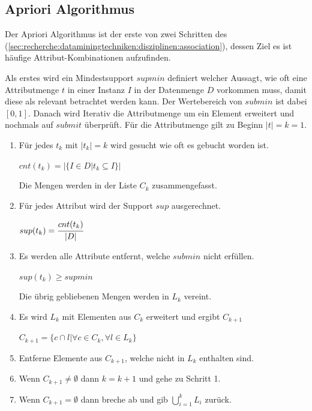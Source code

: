 \subsection{Apriori Algorithmus}
Der Apriori Algorithmus ist der erste von zwei Schritten des  (\cref{sec:recherche:dataminingtechniken:disziplinen:association}), dessen Ziel es ist häufige Attribut-Kombinationen aufzufinden. 

Als erstes wird ein Mindestsupport $supmin$ definiert welcher Aussagt, wie oft eine Attributmenge $t$ in einer Instanz $I$ in der Datenmenge $D$ vorkommen muss, damit diese als relevant betrachtet werden kann. Der Wertebereich von $submin$ ist dabei $[0,1]$. Danach wird Iterativ die Attributmenge um ein Element erweitert und nochmals auf $submit$ überprüft. Für die Attributmenge gilt zu Beginn $|t| = k = 1$.
\begin{enumerate}
\item Für jedes $t_k$ mit $|t_k| = k$ wird gesucht wie oft es gebucht worden ist.
	\begin{center}
	$cnt(t_k) = \big|\{I \in D | t_k \subseteq I \}\big|$
	\end{center}
	Die Mengen werden in der Liste $C_k$ zusammengefasst.
\item Für jedes Attribut wird der Support $sup$ ausgerechnet.
	\begin{center}
	$sup(t_k) = \cfrac{cnt(t_k)}{|D|}$
	\end{center}
\item Es werden alle Attribute entfernt, welche $submin$ nicht erfüllen.
	\begin{center}
	$sup(t_k) \ge supmin$
	\end{center}
	Die übrig gebliebenen Mengen werden in $L_k$ vereint.
\item Es wird $L_k$ mit Elementen aus $C_k$ erweitert und ergibt $C_{k+1}$
	\begin{center}
	$ C_{k+1} = \{c \cap l | \forall c \in C_k, \forall l \in L_k \} $
	\end{center}
\item Entferne Elemente aus $C_{k+1}$, welche nicht in $L_k$ enthalten sind.
\item Wenn $C_{k+1} \neq \emptyset$ dann $k = k+1$ und gehe zu Schritt 1. 
\item Wenn $C_{k+1} = \emptyset$ dann breche ab und gib $\bigcup\limits_{i=1}^{k} L_{i}$ zurück.
\end{enumerate}

